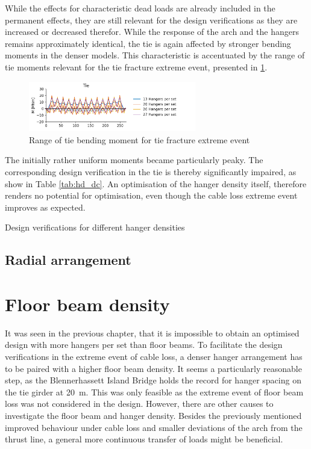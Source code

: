 While the effects for characteristic dead loads are already included in the permanent effects, they are still relevant for the design verifications as they are increased or decreased therefor. While the response of the arch and the hangers remains approximately identical, the tie is again affected by stronger bending moments in the denser models. This characteristic is accentuated by the range of tie moments relevant for the tie fracture extreme event, presented in \cref{fig:hd_tie_fracture}.

\begin{figure}[H]
    \centering
    \includegraphics[trim={0 0 3cm 0},clip, width=0.65\textwidth]{calculations/hanger density/tie fracture_plot.png}
    \caption{Range of tie bending moment for tie fracture extreme event}
    \label{fig:hd_tie_fracture}
\end{figure}

The initially rather uniform moments became particularly peaky. The corresponding design verification in the tie is thereby significantly impaired, as show in Table \ref{tab:hd_dc}. An optimisation of the hanger density itself, therefore renders no potential for optimisation, even though the cable loss extreme event improves as expected.

\begin{table}[H]
    \centering
    \caption{Design verifications for different hanger densities}
    \label{tab:hd_dc}
    \resizebox{0.85\columnwidth}{!}{%
    
    }
\end{table}


\subsection{Radial arrangement} \label{sec:density_radial}


\section{Floor beam density} \label{sec:floor_beam_density}
It was seen in the previous chapter, that it is impossible to obtain an optimised design with more hangers per set than floor beams. To facilitate the design verifications in the extreme event of cable loss, a denser hanger arrangement has to be paired with a higher floor beam density. It seems a particularly reasonable step, as the Blennerhassett Island Bridge holds the record for hanger spacing on the tie girder at \SI{20}{m}. This was only feasible as the extreme event of floor beam loss was not considered in the design. However, there are other causes to investigate the floor beam and hanger density. Besides the previously mentioned improved behaviour under cable loss and smaller deviations of the arch from the thrust line, a general more continuous transfer of loads might be beneficial. \medskip

